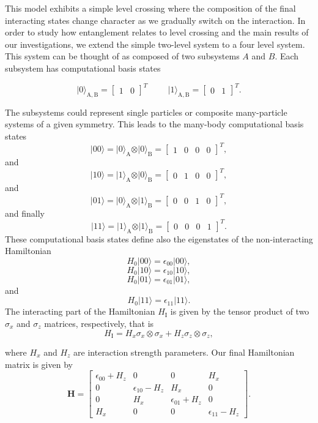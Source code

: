 \documentclass[twocolumn,superscriptaddress,unsortedaddress,
 amsmath,amssymb,
 aps,
]{revtex4-2}
\begin{document}
This  model exhibits a simple level crossing where the
composition of the final interacting states change character as we
gradually switch on the interaction.  In order to study how
entanglement relates to level crossing and the main results of our
investigations, we extend the simple two-level system to a four level
system. This system can be thought of as composed of two subsystems
$A$ and $B$. Each subsystem has computational basis states

\[
\vert 0\rangle_{\mathrm{A,B}}=\begin{bmatrix} 1 & 0\end{bmatrix}^T \hspace{1cm} \vert 1\rangle_{\mathrm{A,B}}=\begin{bmatrix} 0 & 1\end{bmatrix}^T.
\]

The subsystems could represent single particles or composite many-particle systems of a given symmetry.
This leads to the many-body computational basis states
\[
\vert 00\rangle = \vert 0\rangle_{\mathrm{A}}\otimes \vert 0\rangle_{\mathrm{B}}=\begin{bmatrix} 1 & 0 & 0 &0\end{bmatrix}^T,
\]
and
\[
\vert 10\rangle = \vert 1\rangle_{\mathrm{A}}\otimes \vert 0\rangle_{\mathrm{B}}=\begin{bmatrix} 0 & 1 & 0 &0\end{bmatrix}^T,
\]
and
\[
\vert 01\rangle = \vert 0\rangle_{\mathrm{A}}\otimes \vert 1\rangle_{\mathrm{B}}=\begin{bmatrix} 0 & 0 & 1 &0\end{bmatrix}^T,
\]
and finally
\[
\vert 11\rangle = \vert 1\rangle_{\mathrm{A}}\otimes \vert 1\rangle_{\mathrm{B}}=\begin{bmatrix} 0 & 0 & 0 &1\end{bmatrix}^T.
\]
These computational basis states define also the eigenstates of the non-interacting  Hamiltonian
\[
H_0\vert 00 \rangle = \epsilon_{00}\vert 00 \rangle,
\]
\[
H_0\vert 10 \rangle = \epsilon_{10}\vert 10 \rangle,
\]
\[
H_0\vert 01 \rangle = \epsilon_{01}\vert 01 \rangle,
\]
and
\[
H_0\vert 11 \rangle = \epsilon_{11}\vert 11 \rangle.
\]
The interacting part of the Hamiltonian $H_{\mathrm{I}}$ is given by the tensor product of two $\sigma_x$ and $\sigma_z$  matrices, respectively, that is
\[
H_{\mathrm{I}}=H_x\sigma_x\otimes\sigma_x+H_z\sigma_z\otimes\sigma_z,
\]

where $H_x$ and $H_z$ are interaction strength parameters. Our final Hamiltonian matrix is given by
\[
\bm{H}=\begin{bmatrix} \epsilon_{00}+H_z & 0 & 0 & H_x \\
                       0  & \epsilon_{10}-H_z & H_x & 0 \\
                       0 & H_x & \epsilon_{01}+H_z & 0 \\
                       H_x & 0 & 0 & \epsilon_{11} -H_z \end{bmatrix}.
\]
\end{document}
